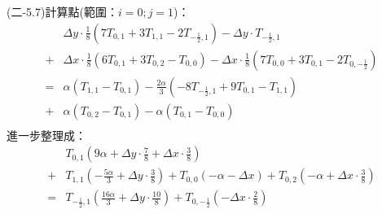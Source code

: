\documentclass[12pt]{article}
\begin{document}
\noindent (二-5.7)計算點(範圍：$i = 0 ; j = 1$)：\\
\begin{equation}
\begin{split}
  &\Delta y \cdot \frac{1}{8}\left(7T_{0,1}+3T_{1,1}-2T_{-\frac{1}{2},1}\right)  
  - \Delta y \cdot T_{-\frac{1}{2},1}\\
  + &\Delta x \cdot \frac{1}{8}\left(6T_{0,1}+3T_{0,2}-T_{0,0}\right)  
  - \Delta x \cdot \frac{1}{8}\left(7T_{0,0}+3T_{0,1}-2T_{0,-\frac{1}{2}}\right) \\
  = & \alpha (T_{1,1}-T_{0,1})-  \frac{2\alpha}{3} (-8T_{-\frac{1}{2},1}+9T_{0,1}-T_{1,1})\\
  + & \alpha (T_{0,2}-T_{0,1}) -  \alpha ( T_{0,1}-T_{0,0}) \\
\end{split}
\end{equation}
\noindent 進一步整理成：
\begin{equation}
\begin{split}
&T_{0,1}(9\alpha+\Delta y \cdot \frac{7}{8}+\Delta x \cdot \frac{3}{8})\\
+&T_{1,1}(-  \frac{5\alpha}{3}+\Delta y \cdot \frac{3}{8})+T_{0,0}(-\alpha- \Delta x)+T_{0,2}(-\alpha+\Delta x \cdot \frac{3}{8})\\
=&T_{-\frac{1}{2},1}(\frac{16\alpha}{3}+\Delta y \cdot \frac{10}{8})+T_{0,-\frac{1}{2}}(- \Delta x \cdot \frac{2}{8})\\
\end{split}
\end{equation}
\end{document}
